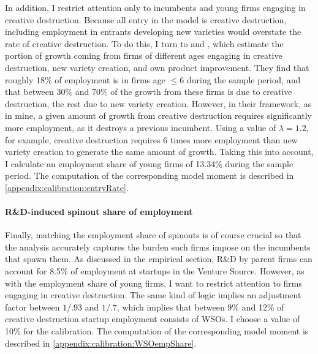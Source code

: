 \documentclass[11pt,english]{article}
\begin{document}
In addition, I restrict attention only to incumbents and young firms engaging in creative destruction. Because all entry in the model is creative destruction, including employment in entrants developing new varieties would overstate the rate of creative destruction. To do this, I turn to \cite{garcia-macia_how_2019} and \cite{klenow_innovative_2020}, which estimate the portion of growth coming from firms of different ages engaging in creative destruction, new variety creation, and own product improvement. They find that roughly 18\% of employment is in firms age $\le 6$ during the sample period, and that between 30\% and 70\% of the growth from these firms is due to creative destruction, the rest due to new variety creation. However, in their framework, as in mine, a given amount of growth from creative destruction requires significantly more employment, as it destroys a previous incumbent. Using a value of $\lambda = 1.2$, for example, creative destruction requires 6 times more employment than new variety creation to generate the same amount of growth. Taking this into account, I calculate an employment share of young firms of 13.34\% during the sample period. The computation of the corresponding model moment is described in \ref{appendix:calibration:entryRate}.
 
\paragraph{R\&D-induced spinout share of employment}

Finally, matching the employment share of spinouts is of course crucial so that the analysis accurately captures the burden such firms impose on the incumbents that spawn them. As discussed in the empirical section, R\&D by parent firms can account for 8.5\% of employment at startups in the Venture Source. However, as with the employment share of young firms, I want to restrict attention to firms engaging in creative destruction. The same kind of logic implies an adjustment factor between $1/.93$ and $1/.7$, which implies that between 9\% and 12\% of creative destruction startup employment consists of WSOs. I choose a value of 10\% for the calibration. The computation of the corresponding model moment is described in \ref{appendix:calibration:WSOempShare}.
\end{document}
